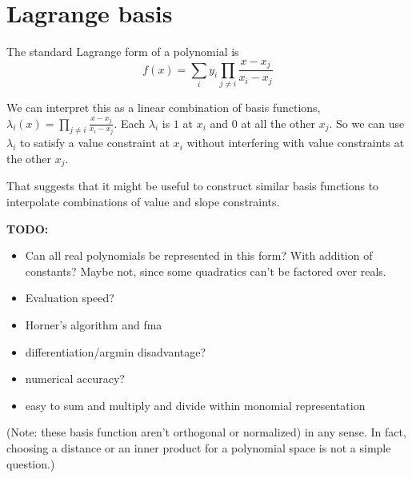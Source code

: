 % 

%

% 
% 

\restoregeometry
  
\section{Lagrange basis}\label{sec:Lagrange-basis}

The standard Lagrange\cite{wiki:Lagrange-polynomial}
form of a polynomial  is
\begin{equation}
f(x) = \sum_{i} y_i \prod_{j \neq i} \frac{x - x_j}{x_i -x_j}
\end{equation}

We can interpret this as a linear combination of basis functions,
$\lambda_i (x) = \prod_{j \neq i} \frac{x - x_j}{x_i -x_j}$.
Each $\lambda_i$ is $1$ at $x_i$ and $0$ at all the other $x_j$.
So we can use $\lambda_i$ to satisfy a value constraint at $x_i$
without interfering with value constraints at the other $x_j$.

That suggests that it might be useful to construct similar basis
functions to interpolate combinations of value and slope 
constraints.

\textbf{TODO:} 
\begin{itemize}
  \item Can all real polynomials be represented in this form? 
        With addition of constants? Maybe not, since some
        quadratics can't be factored over reals.
  \item Evaluation speed?
  \item Horner's algorithm and fma
  \item differentiation/argmin disadvantage?
  \item numerical accuracy?
  \item easy to sum and multiply and divide within monomial
  representation
\end{itemize}

(Note: these basis function aren't orthogonal or normalized)
in any
sense. In fact, choosing a distance or an inner product for
a polynomial space is not a simple question.)


